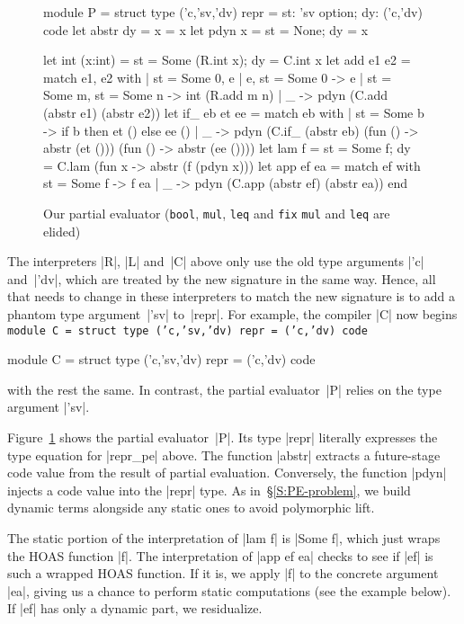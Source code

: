 \begin{figure}
\begin{floatrule}
\begin{code2}
module P = struct
  type ('c,'sv,'dv) repr = {st: 'sv option; dy: ('c,'dv) code}
  let abstr {dy = x} = x    let pdyn x = {st = None; dy = x}

  let int  (x:int)  = {st = Some (R.int x);  dy = C.int x}
  let add e1 e2 = match e1, e2 with
  | {st = Some 0}, e | e, {st = Some 0} -> e
  | {st = Some m}, {st = Some n} -> int (R.add m n)
  | _ -> pdyn (C.add (abstr e1) (abstr e2))
  let if_ eb et ee = match eb with
  | {st = Some b} -> if b then et () else ee ()
  | _ -> pdyn (C.if_ (abstr eb) (fun () -> abstr (et ()))
                                (fun () -> abstr (ee ())))
  let lam f = {st = Some f; dy = C.lam (fun x -> abstr (f (pdyn x)))}
  let app ef ea = match ef with {st = Some f} -> f ea
                  | _ -> pdyn (C.app (abstr ef) (abstr ea)) end
\end{code2}
\medskip
\end{floatrule}
\caption{Our partial evaluator (\ifshort \texttt{bool}, \texttt{mul},
  \texttt{leq} and \texttt{fix} \else \texttt{mul} and \texttt{leq} \fi
  are elided)}
\label{fig:pe}
\end{figure}

The interpreters |R|, |L| and~|C| above only use the old
type arguments |'c| and~|'dv|, which are treated by the new signature
in the same way.  Hence, all that needs to change in these interpreters
to match the new signature is to add a phantom type
argument~|'sv| to~|repr|.
For example, the compiler |C| now begins
\ifshort
\texttt{module C = struct
  type ('c,'sv,'dv) repr = ('c,'dv) code}
\else
\begin{code}
module C = struct
  type ('c,'sv,'dv) repr = ('c,'dv) code
\end{code}
\fi
with the rest the same.
In contrast, the partial evaluator~|P| relies on the type argument |'sv|.


Figure~\ref{fig:pe} shows the partial evaluator~|P|.
Its type |repr| literally expresses the type equation for |repr_pe| above.
The function |abstr|
extracts a future-stage code value from the result of
partial evaluation.  Conversely, the function |pdyn| injects a
code value into the |repr| type. As
in~\S\ref{S:PE-problem}, we build dynamic terms alongside
any static ones to avoid polymorphic lift.

The static portion of the interpretation of |lam f| is |Some f|, 
which just wraps the HOAS
function |f|. The interpretation of |app ef ea| 
checks to see if |ef| is such a wrapped
HOAS function. If it is, we apply |f| to the
concrete argument |ea|, giving us a chance to perform static
computations (see the example below). If
|ef| has only a dynamic part, we residualize.

